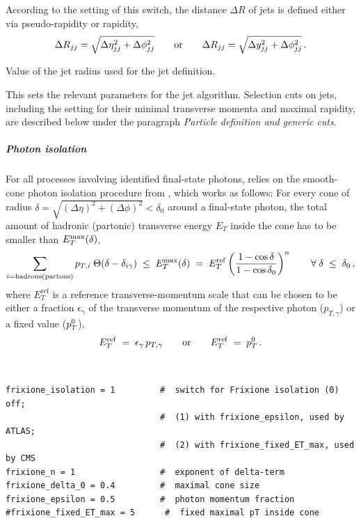 \documentclass[english,11pt]{article}
\begin{document}
\quad According to the setting of this switch, the distance $\Delta R$ of jets is defined either via pseudo-rapidity or rapidity,
\begin{align}
\Delta R_{jj}=\sqrt{\Delta\eta_{jj}^2+\Delta\phi_{jj}^2}\qquad\textnormal{or}\qquad \Delta R_{jj}=\sqrt{\Delta y_{jj}^2+\Delta\phi_{jj}^2}\, .
\label{eq:dRjjdefinition}
\end{align}


\quad Value of the jet radius used for the jet definition.

This sets the relevant parameters for the jet algorithm. Selection cuts on jets, including the setting for their minimal transverse momenta and maximal rapidity, are described below under the paragraph {\it Particle definition and generic cuts}.

\subparagraph{Photon isolation}\quad

For all processes involving identified final-state photons, \Matrix{} relies on the smooth-cone photon isolation procedure from , which works as follows:
For every cone of radius \mbox{$\delta=\sqrt{(\Delta \eta)^2+(\Delta \phi)^2}<\delta_0$} around a final-state photon, the total amount of hadronic (partonic) transverse energy $E_T$
inside the cone has to be smaller than $E_{T}^{\rm max}(\delta)$,
\begin{align}
\sum_{i=\mathrm{hadrons(partons)}}p_{T,i}\;\Theta(\delta-\delta_{i\gamma})\;\leq\;E_{T}^{\rm max}(\delta)\;=\; E_T^{\mathrm{ref}} \left(\frac{1-\cos \delta}{1- \cos \delta_0}\right)^n \qquad \forall\; \delta\;\leq\;\delta_0\, ,
\label{eq:frixione}
\end{align}
where $E_T^{\mathrm{ref}}$ is a reference transverse-momentum scale that can be chosen to be either a fraction $\epsilon_\gamma$ of the transverse momentum of the respective photon ($p_{T,\gamma}$) or a fixed value ($p_T^0$),
\begin{align}
E_T^{\mathrm{ref}}\;=\;\epsilon_\gamma \,p_{T,\gamma} \qquad\textnormal{or}\qquad E_T^{\mathrm{ref}}\;=\;p_T^0 \, .
\label{eq:frixionepTscale}
\end{align}


{\tt
\begin{lstlisting}
frixione_isolation = 1         #  switch for Frixione isolation (0) off;
                               #  (1) with frixione_epsilon, used by ATLAS;
                               #  (2) with frixione_fixed_ET_max, used by CMS
frixione_n = 1                 #  exponent of delta-term
frixione_delta_0 = 0.4         #  maximal cone size
frixione_epsilon = 0.5         #  photon momentum fraction
#frixione_fixed_ET_max = 5      #  fixed maximal pT inside cone
\end{lstlisting}
}
\end{document}
